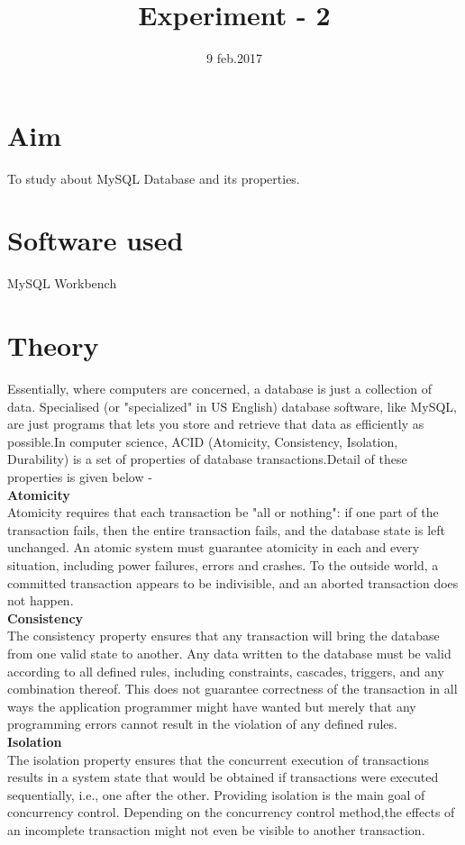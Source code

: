 \documentclass[100pt]{article}
\title{Experiment - 2} %
\date{9 feb.2017} %
\begin{document}
		\maketitle %
	\section{Aim}
    To study about MySQL Database and its properties.
	\section{Software used}
	MySQL Workbench
	\section{Theory}
     Essentially, where computers are concerned, a database is just a collection of data. Specialised (or "specialized" in US English) database software, like MySQL, are just programs that lets you store and retrieve that data as efficiently as possible.In computer science, ACID (Atomicity, Consistency, Isolation, Durability) is a set of properties of database transactions.Detail of these properties is given below - \\	
    \textbf{Atomicity}\\
    Atomicity requires that each transaction be "all or nothing": if one part of the transaction fails, then the entire transaction fails, and the database state is left unchanged. An atomic system must guarantee atomicity in each and every situation, including power failures, errors and crashes. To the outside world, a committed transaction appears to be indivisible, and an aborted transaction does not happen.\\
    \textbf{Consistency}\\
    The consistency property ensures that any transaction will bring the database from one valid state to another. Any data written to the database must be valid according to all defined rules, including constraints, cascades, triggers, and any combination thereof. This does not guarantee correctness of the transaction in all ways the application programmer might have wanted but merely that any programming errors cannot result in the violation of any defined rules.\\
    \newpage
    \textbf{Isolation}\\
    The isolation property ensures that the concurrent execution of transactions results in a system state that would be obtained if transactions were executed sequentially, i.e., one after the other. Providing isolation is the main goal of concurrency control. Depending on the concurrency control method,the effects of an incomplete transaction might not even be visible to another transaction.\\
\end{document}
